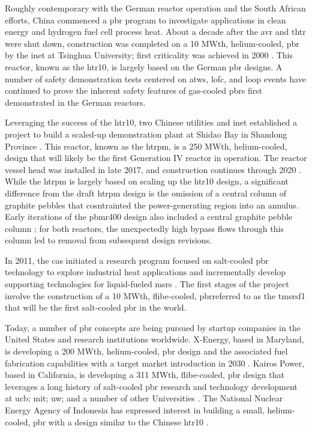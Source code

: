 Roughly contemporary with the German reactor operation and the South African efforts, China commenced a \gls{pbr} program to investigate applications in clean energy and hydrogen fuel cell process heat. About a decade after the \gls{avr} and \gls{thtr} were shut down, construction was completed on a 10 MWth, helium-cooled, \gls{pbr} by the \gls{inet} at Tsinghua University; first criticality was achieved in 2000 \cite{gao,chen_htr,xu_htr}. This reactor, known as the \gls{htr10}, is largely based on the German \gls{pbr} designs. A number of safety demonstration tests centered on \gls{atws}, \gls{lofc}, and \gls{loop} events have continued to prove the inherent safety features of gas-cooled \glspl{pbr} first demonstrated in the German reactors.

Leveraging the success of the \gls{htr10}, two Chinese utilities and \gls{inet} established a project to build a scaled-up demonstration plant at Shidao Bay in Shandong Province \cite{xu_htr,htrpm,htrpm_website}. This reactor, known as the \gls{htrpm}, is a 250 MWth, helium-cooled, design that will likely be the first Generation IV reactor in operation. The reactor vessel head was installed in late 2017, and construction continues through 2020 \cite{htrpm_2020}. While the \gls{htrpm} is largely based on scaling up the \gls{htr10} design, a significant difference from the draft \gls{htrpm} design is the omission of a central column of graphite pebbles that cosntrainted the power-generating region into an annulus. Early iterations of the \gls{pbmr400} design also included a central graphite pebble column \cite{koster}; for both reactors, the unexpectedly high bypass flows through this column led to removal from subsequent design revisions.

In 2011, the \gls{cas} initiated a research program focused on salt-cooled \gls{pbr} technology to explore industrial heat applications and incrementally develop supporting technologies for liquid-fueled \glspl{msr} \cite{dai}. The first stages of the project involve the construction of a 10 MWth, \gls{flibe}-cooled, \gls{pbr}referred to as the \gls{tmsrsf1} that will be the first salt-cooled \gls{pbr} in the world. 

Today, a number of \gls{pbr} concepts are being pursued by startup companies in the United States and research institutions worldwide. X-Energy, based in Maryland, is developing a 200 MWth, helium-cooled, \gls{pbr} design and the associated fuel fabrication capabilities with a target market introduction in 2030 \cite{x_energy}. Kairos Power, based in California, is developing a 311 MWth, \gls{flibe}-cooled, \gls{pbr} design that leverages a long history of salt-cooled \gls{pbr} research and technology development at \gls{ucb}; \gls{mit}; \gls{uw}; and a number of other Universities \cite{kairos}. The National Nuclear Energy Agency of Indonesia has expressed interest in building a small, helium-cooled, \gls{pbr} with a design similar to the Chinese \gls{htr10} \cite{liem}. 

